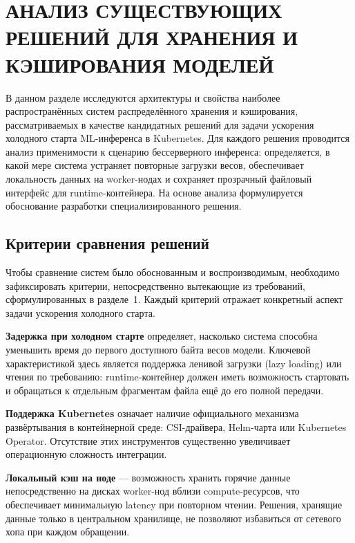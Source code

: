 \chapter{АНАЛИЗ СУЩЕСТВУЮЩИХ РЕШЕНИЙ ДЛЯ ХРАНЕНИЯ И КЭШИРОВАНИЯ МОДЕЛЕЙ}

В данном разделе исследуются архитектуры и свойства наиболее распространённых систем распределённого хранения и кэширования, рассматриваемых в качестве кандидатных решений для задачи ускорения холодного старта ML-инференса в Kubernetes. Для каждого решения проводится анализ применимости к сценарию бессерверного инференса: определяется, в какой мере система устраняет повторные загрузки весов, обеспечивает локальность данных на worker-нодах и сохраняет прозрачный файловый интерфейс для runtime-контейнера. На основе анализа формулируется обоснование разработки специализированного решения.

\section{Критерии сравнения решений}
\label{sec:criteria}

Чтобы сравнение систем было обоснованным и воспроизводимым, необходимо зафиксировать критерии, непосредственно вытекающие из требований, сформулированных в разделе~1. Каждый критерий отражает конкретный аспект задачи ускорения холодного старта.

\textbf{Задержка при холодном старте} определяет, насколько система способна уменьшить время до первого доступного байта весов модели. Ключевой характеристикой здесь является поддержка ленивой загрузки (lazy loading) или чтения по требованию: runtime-контейнер должен иметь возможность стартовать и обращаться к отдельным фрагментам файла ещё до его полной передачи.

\textbf{Поддержка Kubernetes} означает наличие официального механизма развёртывания в контейнерной среде: CSI-драйвера, Helm-чарта или Kubernetes Operator. Отсутствие этих инструментов существенно увеличивает операционную сложность интеграции.

\textbf{Локальный кэш на ноде} — возможность хранить горячие данные непосредственно на дисках worker-нод вблизи compute-ресурсов, что обеспечивает минимальную latency при повторном чтении. Решения, хранящие данные только в центральном хранилище, не позволяют избавиться от сетевого хопа при каждом обращении.

